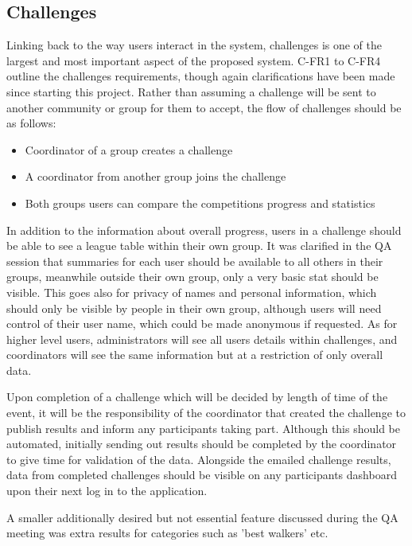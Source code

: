 \subsection{Challenges}
Linking back to the way users interact in the system, challenges is one of the largest and most important aspect of the proposed system. C-FR1 to C-FR4 outline the challenges requirements, though again clarifications have been made since starting this project. Rather than assuming a challenge will be sent to another community or group for them to accept, the flow of challenges should be as follows:
\begin{itemize}
\item Coordinator of a group creates a challenge
\item A coordinator from another group joins the challenge
\item Both groups users can compare the competitions progress and statistics
\end{itemize}
In addition to the information about overall progress, users in a challenge should be able to see a league table within their own group. It was clarified in the QA session that summaries for each user should be available to all others in their groups, meanwhile outside their own group, only a very basic stat should be visible. This goes also for privacy of names and personal information, which should only be visible by people in their own group, although users will need control of their user name, which could be made anonymous if requested. As for higher level users, administrators will see all users details within challenges, and coordinators will see the same information but at a restriction of only overall data. \par
Upon completion of a challenge which will be decided by length of time of the event, it will be the responsibility of the coordinator that created the challenge to publish results and inform any participants taking part. Although this should be automated, initially sending out results should be completed by the coordinator to give time for validation of the data. Alongside the emailed challenge results, data from completed challenges should be visible on any participants dashboard upon their next log in to the application. \par
A smaller additionally desired but not essential feature discussed during the QA meeting was extra results for categories such as 'best walkers' etc.

